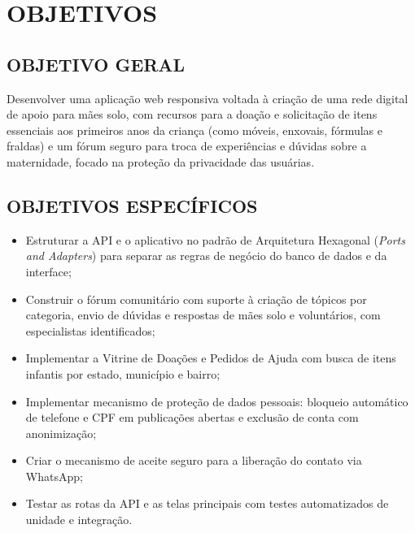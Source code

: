 \section{OBJETIVOS}

\subsection{OBJETIVO GERAL}
Desenvolver uma aplicação web responsiva voltada à criação de uma rede digital de apoio para mães solo, com recursos para a doação e solicitação de itens essenciais aos primeiros anos da criança (como móveis, enxovais, fórmulas e fraldas) e um fórum seguro para troca de experiências e dúvidas sobre a maternidade, focado na proteção da privacidade das usuárias.

\subsection{OBJETIVOS ESPECÍFICOS}
\begin{itemize}
    \item Estruturar a API e o aplicativo no padrão de Arquitetura Hexagonal (\textit{Ports and Adapters}) para separar as regras de negócio do banco de dados e da interface;
    \item Construir o fórum comunitário com suporte à criação de tópicos por categoria, envio de dúvidas e respostas de mães solo e voluntários, com especialistas identificados;
    \item Implementar a Vitrine de Doações e Pedidos de Ajuda com busca de itens infantis por estado, município e bairro;
    \item Implementar mecanismo de proteção de dados pessoais: bloqueio automático de telefone e CPF em publicações abertas e exclusão de conta com anonimização;
    \item Criar o mecanismo de aceite seguro para a liberação do contato via WhatsApp;
    \item Testar as rotas da API e as telas principais com testes automatizados de unidade e integração.
\end{itemize}